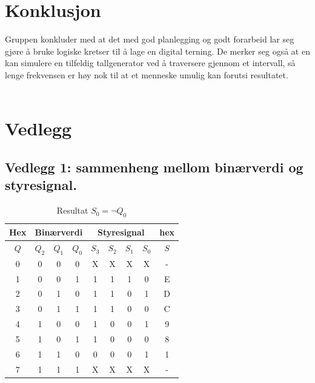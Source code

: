 \documentclass[12pt,norsk,a4paper]{article}
\begin{document}
\clearpage

\section{Konklusjon}
Gruppen konkluder med at det med god planlegging og godt forarbeid lar seg gjøre å bruke logiske kretser til å lage en digital terning. De merker seg også at en kan simulere en tilfeldig tallgenerator ved å traversere gjennom et intervall, så lenge frekvensen er høy nok til at et menneske umulig kan forutsi resultatet.\\
\\


\clearpage

\section{Vedlegg}
    \subsection{Vedlegg 1: sammenheng mellom binærverdi og styresignal.}
    \begin{table}[H]
    \begin{center}
    \begin{tabular}{|c|c|c|c|c|c|c|c|c|}
    \hline
    Hex & \multicolumn{3}{c}{Binærverdi} & \multicolumn{4}{|c|}{Styresignal}&hex \\ \hline
    $Q$ & $Q_2$ & $Q_1$ & $Q_0$ & $S_3$ & $S_2$ & $S_1$ & $S_0$ & $S$ \\ \hline
    0 & 0 & 0 & 0 & X & X & X & X & - \\ \hline 
    1 & 0 & 0 & 1 & 1 & 1 & 1 & 0 & E \\ \hline
    2 & 0 & 1 & 0 & 1 & 1 & 0 & 1 & D \\ \hline
    3 & 0 & 1 & 1 & 1 & 1 & 0 & 0 & C \\ \hline
    4 & 1 & 0 & 0 & 1 & 0 & 0 & 1 & 9 \\ \hline
    5 & 1 & 0 & 1 & 1 & 0 & 0 & 0 & 8 \\ \hline
    6 & 1 & 1 & 0 & 0 & 0 & 0 & 1 & 1 \\ \hline
    7 & 1 & 1 & 1 & X & X & X & X & - \\ \hline
    \end{tabular}
    \end{center}
    \caption{Resultat $S_0=\neg Q_0$}
    \end{table}
    \clearpage
\end{document}
